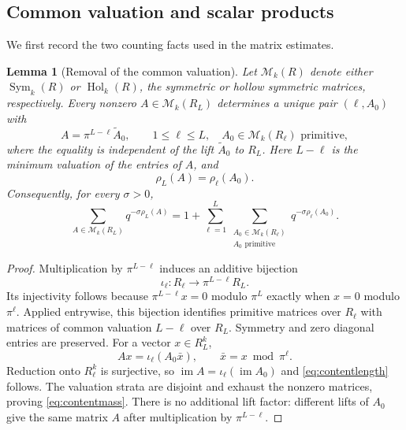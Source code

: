 \documentclass[11pt]{article}
\numberwithin{equation}{section}
\newtheorem{lemma}[theorem]{Lemma}
\theoremstyle{remark}
\newcommand{\A}{\mathbb A}
\newcommand{\Sym}{\operatorname{Sym}}
\newcommand{\Hol}{\operatorname{Hol}}
\begin{document}
\subsection{Common valuation and scalar products}
We first record the two counting facts used in the matrix estimates.

\begin{lemma}[Removal of the common valuation]\label{lem:content}
Let $\mathcal M_k(R)$ denote either $\Sym_k(R)$ or $\Hol_k(R)$,
the symmetric or hollow symmetric matrices, respectively. Every nonzero
$A\in\mathcal M_k(R_L)$ determines a unique pair $(\ell,A_0)$ with
\[
 A=\pi^{L-\ell}\widetilde A_0,\qquad
 1\le\ell\le L,\quad A_0\in\mathcal M_k(R_\ell)\text{ primitive},
\]
where the equality is independent of the lift $\widetilde A_0$ to
$R_L$. Here $L-\ell$ is the minimum valuation of the entries of $A$,
and
\begin{equation}\label{eq:contentlength}
 \rho_L(A)=\rho_\ell(A_0).
\end{equation}
Consequently, for every $\sigma >0$,
\begin{equation}\label{eq:contentmass}
 \sum_{A\in\mathcal M_k(R_L)}q^{-\sigma \rho_L(A)}
 =1+\sum_{\ell=1}^{L}
       \sum_{\substack{A_0\in\mathcal M_k(R_\ell)\\A_0\text{ primitive}}}
              q^{-\sigma \rho_\ell(A_0)}.
\end{equation}
\end{lemma}
\begin{proof}
Multiplication by $\pi^{L-\ell}$ induces an additive bijection
\[
 \iota_\ell:R_\ell\longrightarrow\pi^{L-\ell}R_L.
\]
Its injectivity follows because
$\pi^{L-\ell}x=0$ modulo $\pi^L$ exactly when $x=0$ modulo
$\pi^\ell$. Applied entrywise, this bijection identifies primitive
matrices over $R_\ell$ with matrices of common valuation $L-\ell$
over $R_L$. Symmetry and zero diagonal entries are preserved.
For a vector $x\in R_L^k$,
\[
 Ax=\iota_\ell(A_0\bar x),\qquad \bar x=x\bmod\pi^\ell.
\]
Reduction onto $R_\ell^k$ is surjective, so
$\operatorname{im} A=\iota_\ell(\operatorname{im} A_0)$ and
\eqref{eq:contentlength} follows. The valuation strata are disjoint
and exhaust the nonzero matrices, proving \eqref{eq:contentmass}.
There is no additional lift factor: different lifts of $A_0$ give
the same matrix $A$ after multiplication by $\pi^{L-\ell}$.
\end{proof}
\end{document}
